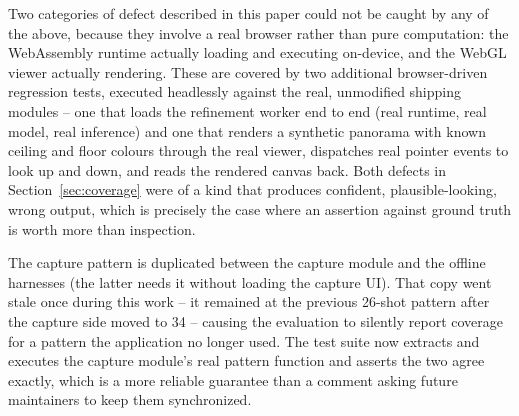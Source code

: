 \documentclass[11pt]{article}
\begin{document}
Two categories of defect described in this paper could not be caught by any of the above, because they involve a real browser rather than pure computation: the WebAssembly runtime actually loading and executing on-device, and the WebGL viewer actually rendering. These are covered by two additional browser-driven regression tests, executed headlessly against the real, unmodified shipping modules -- one that loads the refinement worker end to end (real runtime, real model, real inference) and one that renders a synthetic panorama with known ceiling and floor colours through the real viewer, dispatches real pointer events to look up and down, and reads the rendered canvas back. Both defects in Section~\ref{sec:coverage} were of a kind that produces confident, plausible-looking, wrong output, which is precisely the case where an assertion against ground truth is worth more than inspection.

The capture pattern is duplicated between the capture module and the offline harnesses (the latter needs it without loading the capture UI). That copy went stale once during this work -- it remained at the previous 26-shot pattern after the capture side moved to 34 -- causing the evaluation to silently report coverage for a pattern the application no longer used. The test suite now extracts and executes the capture module's real pattern function and asserts the two agree exactly, which is a more reliable guarantee than a comment asking future maintainers to keep them synchronized.
\end{document}
